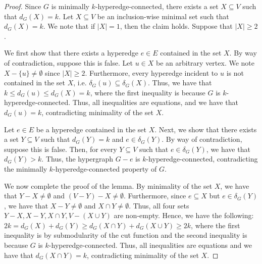 \documentclass{article}
\newcommand{\knote}[1]{{\color{red}[{\tiny Karthik: \bf #1}]\marginpar{\color{red}*}}}
\begin{document}
\begin{proof}
    Since $G$ is minimally $k$-hyperedge-connected, there exists a set $X \subseteq V$ such that $d_G(X) = k$. Let $X\subseteq V$ be an inclusion-wise minimal set such that $d_G(X)=k$. We note that if $|X| = 1$, then the claim holds. Suppose that $|X| \geq 2$.

    We first show that there exists a hyperedge $e\in E$ contained in the set $X$. By way of contradiction, suppose this is false. Let $u \in X$ be an arbitrary vertex. We note $X - \{u\} \not = \emptyset$ since $|X| \geq 2$. Furthermore, every hyperedge incident to $u$ is not contained in the set $X$, i.e. $\delta_G(u) \subseteq \delta_G(X)$. Thus, we have that $k \leq d_G(u) \leq d_G(X) = k$, where the first inequality is because $G$ is $k$-hyperedge-connected. Thus, all inequalities are equations, and we have that $d_G(u) = k$, contradicting minimality of the set $X$.

    Let $e\in E$ be a hyperedge contained in the set $X$. 
    Next, we show that %
    there exists a set $Y \subseteq V$ such that $d_G(Y) = k$ and $e \in \delta_G(Y)$. 
    By way of contradiction, suppose this is false. Then, for every $Y \subseteq V$ such that $e \in \delta_G(Y)$, we have that $d_G(Y) > k$. Thus, the hypergraph $G - e$ is $k$-hyperedge-connected, contradicting the minimally $k$-hyperedge-connected property of $G$.

    We now complete the proof of the lemma. By minimality of the set $X$, we have that $Y-X\neq \emptyset$ and $(V-Y)-X\neq \emptyset$. 
    Furthermore, since $e \subseteq X$ but $e \in \delta_G(Y)$, we have that $X-Y \not = \emptyset$ 
    and $X \cap Y \not = \emptyset$. 
    Thus, all four sets $Y-X, X-Y, X\cap Y, V-(X\cup Y)$ are non-empty.
    Hence, we have the following: $2k = d_{G}(X) + d_G(Y) \geq d_G(X\cap Y) + d_G(X\cup Y) \geq 2k$, where the first inequality is by submodularity of the cut function and the second inequality is because $G$ is $k$-hyperedge-connected. 
    Thus, all inequalities are equations and we have that $d_{G}(X\cap Y) = k$, contradicting minimality of the set $X$.
\end{proof}
\end{document}
